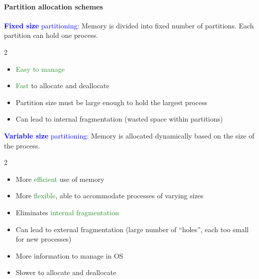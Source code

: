 \paragraph{Partition allocation schemes}
\textcolor{Blue}{\textbf{Fixed size} partitioning}: Memory is divided into
fixed number of partitions. Each partition can hold one process.
\vspace{-4mm}
\begin{multicols}{2}
  \begin{itemize}
    \item \textcolor{ForestGreen}{Easy to manage}
    \item \textcolor{ForestGreen}{Fast} to allocate and deallocate
  \end{itemize}
  \vfill\null
  \begin{itemize}
    \item Partition size must be \textcolor{Bittersweet}{large enough} to hold
      the largest process
    \item Can lead to \textcolor{Bittersweet}{internal fragmentation} (wasted
      space within partitions)
  \end{itemize}
\end{multicols}

\textcolor{Blue}{\textbf{Variable size} partitioning}: Memory is allocated
dynamically based on the size of the process.
\vspace{-4mm}
\begin{multicols}{2}
  \begin{itemize}
    \item More \textcolor{ForestGreen}{efficient} use of memory
    \item More \textcolor{ForestGreen}{flexible}, able to accommodate processes
      of varying sizes
    \item Eliminates \textcolor{ForestGreen}{internal fragmentation}
  \end{itemize}
  \vfill\null
  \begin{itemize}
    \item Can lead to \textcolor{Bittersweet}{external fragmentation} (large
      number of ``holes'', each too small for new processes)
    \item \textcolor{Bittersweet}{More information} to manage in OS
    \item \textcolor{Bittersweet}{Slower} to allocate and deallocate
  \end{itemize}
\end{multicols}

